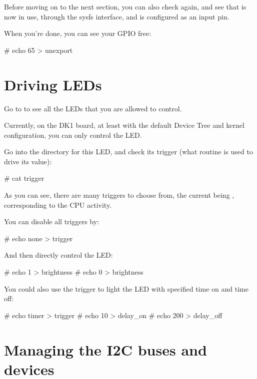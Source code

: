 Before moving on to the next section, you can also check
 again, and see that  is now
in use, through the sysfs interface, and is configured as an input pin.

When you're done, you can see your GPIO free:

\begin{bashinput}
# echo 65 > unexport
\end{bashinput}

\section{Driving LEDs}

Go to  to see all the LEDs that you are allowed
to control.

Currently, on the DK1 board, at least with the default Device Tree and
kernel configuration, you can only control the  LED.

Go into the directory for this LED, and check its trigger (what
routine is used to drive its value):

\begin{bashinput}
# cat trigger
\end{bashinput}

As you can see, there are many triggers to choose from, the current
being , corresponding to the CPU activity.

You can disable all triggers by:

\begin{bashinput}
# echo none > trigger
\end{bashinput}

And then directly control the LED:

\begin{bashinput}
# echo 1 > brightness
# echo 0 > brightness
\end{bashinput}

You could also use the  trigger to light the LED
with specified time on and time off:

\begin{bashinput}
# echo timer > trigger
# echo 10 > delay_on
# echo 200 > delay_off
\end{bashinput}

\section{Managing the I2C buses and devices}


